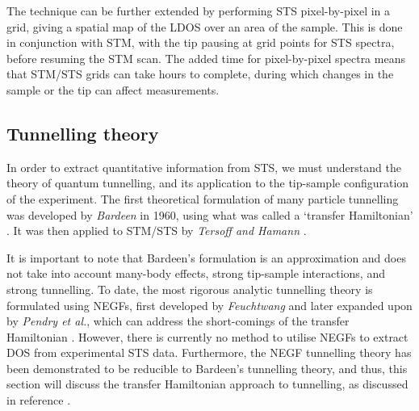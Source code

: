 The technique can be further extended by performing \ac{STS} pixel-by-pixel in a grid, giving a spatial map of the \ac{LDOS} over an area of the sample. This is done in conjunction with \ac{STM}, with the tip pausing at grid points for \ac{STS} spectra, before resuming the \ac{STM} scan. The added time for pixel-by-pixel spectra means that \ac{STM}/\ac{STS} grids can take hours to complete, during which changes in the sample or the tip can affect measurements. 


\subsection{Tunnelling theory}
In order to extract quantitative information from \ac{STS}, we must understand the theory of quantum tunnelling, and its application to the tip-sample configuration of the experiment. The first theoretical formulation of many particle tunnelling was developed by \textit{Bardeen} in 1960, using what was called a `transfer Hamiltonian' \citep{PhysRevLett.6.57}. It was then applied to \ac{STM}/\ac{STS} by \textit{Tersoff and Hamann} \citep{0957-4484-17-8-R01,tersoff1985theory}. 

It is important to note that Bardeen's formulation is an approximation and does not take into account many-body effects, strong tip-sample interactions, and strong tunnelling. To date, the most rigorous analytic tunnelling theory is formulated using \acp{NEGF}, first developed by \textit{Feuchtwang} and later expanded upon by \textit{Pendry et al.}, which can address the short-comings of the transfer Hamiltonian \citep{feuchtwang1974tunneling, pendry1991theory} . However, there is currently no method to utilise \acp{NEGF} to extract \ac{DOS} from experimental \ac{STS} data. Furthermore, the \ac{NEGF} tunnelling theory has been demonstrated to be reducible to Bardeen's tunnelling theory, and thus, this section will discuss the transfer Hamiltonian approach to tunnelling, as discussed in reference \citep{0957-4484-17-8-R01}.

